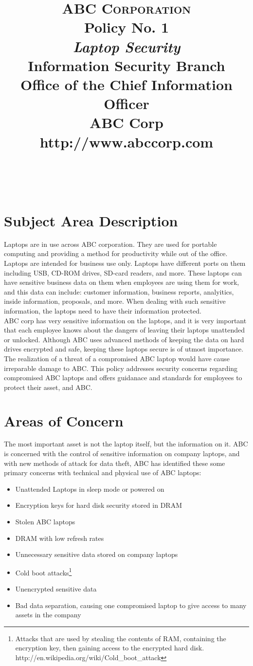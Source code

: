\documentclass[10pt, twocolumn]{article}
\title{
\begin{minipage}{1\textwidth}
\begin{flushleft}
\large{\textbf{\textsc{ABC Corporation}}\\
Policy No. 1\\
\emph{Laptop Security}\\
Information Security Branch\\
Office of the Chief Information Officer\\
ABC Corp\\
\small http://www.abccorp.com
}\huge\\ [0pt] %
\end{flushleft}
\end{minipage}
\horrule{0.1pt}\\[0.0cm]
\date{}
}
\numberwithin{equation}{section} %
\numberwithin{figure}{section} %
\numberwithin{table}{section} %
\begin{document}
\maketitle 
\section{Subject Area Description}
Laptops are in use across ABC corporation.  They are used for portable computing and providing a method for productivity while out of the office.  Laptops are intended for business use only.  Laptops have different ports on them including USB, CD-ROM drives, SD-card readers, and more.  These laptops can have sensitive business data on them when employees are using them for work, and this data can include: customer information, business reports, analyitics, inside information, proposals, and more.  When dealing with such sensitive information, the laptops need to have their information protected.\\ 

ABC corp has very sensitive information on the laptops, and it is very important that each employee knows about the dangers of leaving their laptops unattended or unlocked.  Although ABC uses advanced methods of keeping the data on hard drives encrypted and safe, keeping these laptops secure is of utmost importance.  The realization of a threat of a compromised ABC laptop would have cause irreparable damage to ABC.  This policy addresses security concerns regarding compromised ABC laptops and offers guidanace and standards for employees to protect their asset, and ABC.\\
\section{Areas of Concern}
The most important asset is not the laptop itself, but the information on it.  ABC is concerned with the control of sensitive information on company laptops, and with new methods of attack for data theft, ABC has identified these some primary concerns with technical and physical use of ABC laptops:

 \begin{itemize}
 	\item Unattended Laptops in sleep mode or powered on
 	\item Encryption keys for hard disk security stored in DRAM
 	\item Stolen ABC laptops
 	\item DRAM with low refresh rates
 	\item Unnecessary sensitive data stored on company laptops
 	\item Cold boot attacks\footnote{Attacks that are used by stealing the contents of RAM, containing the encryption key, then gaining access to the encrypted hard disk.  http://en.wikipedia.org/wiki/Cold\_boot\_attack}
 	\item Unencrypted sensitive data
 	\item Bad data separation, causing one compromised laptop to give access to many assets in the company
\end{itemize}
\end{document}
